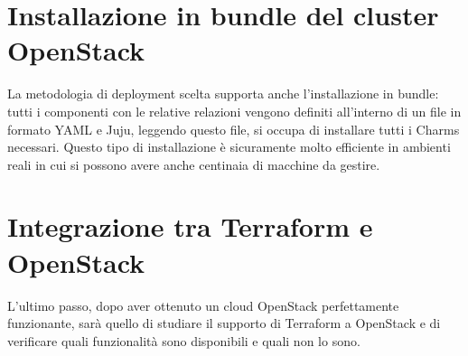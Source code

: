 \section{Installazione in bundle del cluster OpenStack}
La metodologia di deployment scelta supporta anche l'installazione in bundle: tutti i componenti con le relative relazioni vengono definiti all'interno di un file in formato YAML e Juju, leggendo questo file, si occupa di installare tutti i Charms necessari. Questo tipo di installazione è sicuramente molto efficiente in ambienti reali in cui si possono avere anche centinaia di macchine da gestire.

\section{Integrazione tra Terraform e OpenStack}
L'ultimo passo, dopo aver ottenuto un cloud OpenStack perfettamente funzionante, sarà quello di studiare il supporto di Terraform a OpenStack e di verificare quali funzionalità sono disponibili e quali non lo sono.